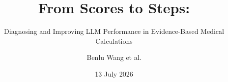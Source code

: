 \title{From Scores to Steps:}
\subtitle{Diagnosing and Improving LLM Performance in Evidence-Based Medical Calculations}
\author{Benlu Wang et al.}
\date{13 July 2026}
\newcommand{\paperVenue}{EMNLP 2025 Main Conference, Oral Presentation}
\newcommand{\courseInfo}{Deep Learning Seminar}
\newcommand{\groupMembers}{Dương Tuấn Anh --- 23120208 \enspace|\enspace Nguyễn Gia Bảo --- 23122015\\Lại Nguyễn Hồng Thanh --- 23122018}
\newcommand{\supervisors}{Supervisors: Dr. Nguyễn Tiến Huy \enspace|\enspace Dr. Lê Thanh Tùng}
